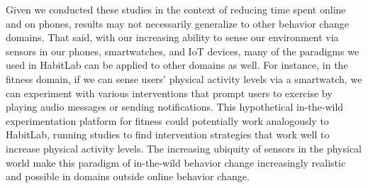 Given we conducted these studies in the context of reducing time spent online and on phones, results may not necessarily generalize to other behavior change domains. That said, with our increasing ability to sense our environment via sensors in our phones, smartwatches, and IoT devices, many of the paradigms we used in HabitLab can be applied to other domains as well. For instance, in the fitness domain, if we can sense users' physical activity levels via a smartwatch, we can experiment with various interventions that prompt users to exercise by playing audio messages or sending notifications. This hypothetical in-the-wild experimentation platform for fitness could potentially work analogously to HabitLab, running studies to find intervention strategies that work well to increase physical activity levels. The increasing ubiquity of sensors in the physical world make this paradigm of in-the-wild behavior change increasingly realistic and possible in domains outside online behavior change.

